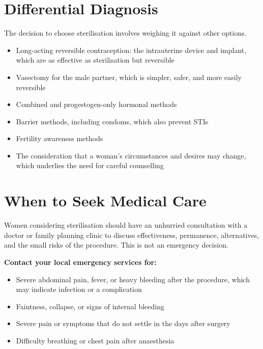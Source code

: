 \section*{Differential Diagnosis}
The decision to choose sterilisation involves weighing it against other options.
\begin{itemize}
    \item Long-acting reversible contraception: the intrauterine device and implant, which are as effective as sterilisation but reversible
    \item Vasectomy for the male partner, which is simpler, safer, and more easily reversible
    \item Combined and progestogen-only hormonal methods
    \item Barrier methods, including condoms, which also prevent STIs
    \item Fertility awareness methods
    \item The consideration that a woman's circumstances and desires may change, which underlies the need for careful counselling
\end{itemize}

\section*{When to Seek Medical Care}
Women considering sterilisation should have an unhurried consultation with a doctor or family planning clinic to discuss effectiveness, permanence, alternatives, and the small risks of the procedure. This is not an emergency decision.

\textbf{Contact your local emergency services for:}
\begin{itemize}
    \item Severe abdominal pain, fever, or heavy bleeding after the procedure, which may indicate infection or a complication
    \item Faintness, collapse, or signs of internal bleeding
    \item Severe pain or symptoms that do not settle in the days after surgery
    \item Difficulty breathing or chest pain after anaesthesia
\end{itemize}

